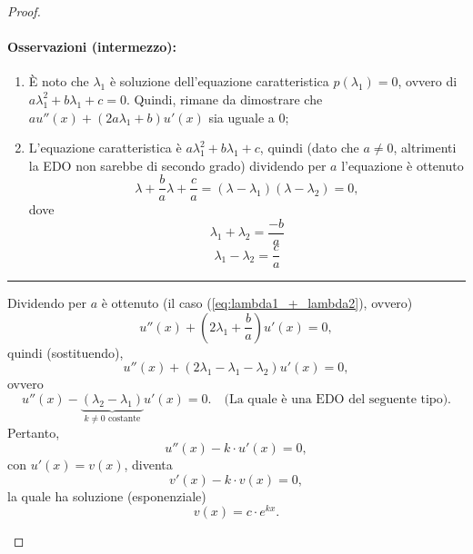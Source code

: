 \begin{proof}
\begin{enumerate}
		\paragraph{Osservazioni (intermezzo):}
		\begin{enumerate}
			\item È noto che $\lambda_1$ è soluzione dell'equazione caratteristica $p(\lambda_1)=0$, ovvero di $a\lambda_1^2+b\lambda_1 +c=0$. Quindi, rimane da dimostrare che $a u''(x)+(2a\lambda_1 + b)u'(x)$ sia uguale a 0;
			\item L'equazione caratteristica è $a\lambda_1^2+b\lambda_1 +c$, quindi (dato che $a\neq0$, altrimenti la EDO non sarebbe di secondo grado) dividendo per $a$ l'equazione è ottenuto
			\begin{equation*}
				\lambda + \frac{b}{a} \lambda + \frac{c}{a}= (\lambda - \lambda_1)(\lambda - \lambda_2) = 0,
			\end{equation*}
			dove
			\begin{equation}\label{eq:lambda1_+_lambda2}
				\lambda_1 + \lambda_2 = \frac{-b}{a}
			\end{equation}
			\begin{equation*}
				\lambda_1 - \lambda_2 = \frac{c}{a}
			\end{equation*}
		\end{enumerate}
		\hrule\vspace{2px}
	
		\noindent Dividendo per $a$ è ottenuto (il caso (\ref{eq:lambda1_+_lambda2}), ovvero)
		\begin{equation*}
			u''(x)+\left(2\lambda_1+\frac{b}{a}\right)u'(x)=0,
		\end{equation*}
		quindi (sostituendo),
		\begin{equation*}
			u''(x) + (2\lambda_1 -\lambda_1-\lambda_2) u'(x) = 0,
		\end{equation*}
		ovvero
		\begin{equation*}
			u''(x) - \underbrace{(\lambda_2-\lambda_1)}_{k\neq 0\text{ costante}} u'(x) = 0.\quad\text{(La quale è una EDO del seguente tipo)}.
		\end{equation*}
		Pertanto,
		\begin{equation*}
			u''(x)- k\cdot u'(x) = 0,
		\end{equation*}
		con $u'(x)=v(x)$, diventa
		\begin{equation}\label{eq:edo_variabili_separabili_dimostrazione_integrale_generale_edo_seecondo_grado}
			v'(x) - k \cdot v(x)=0,
		\end{equation}
		la quale ha soluzione (esponenziale)
		\begin{equation*}
			v(x) = c \cdot e^{kx}.
		\end{equation*}
		

\end{enumerate}
\end{proof}
